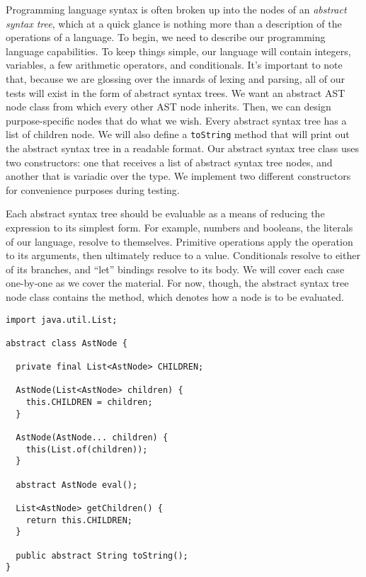 Programming language syntax is often broken up into the nodes of an \emph{abstract syntax tree}, which at a quick glance is nothing more than a description of the operations of a language. To begin, we need to describe our programming language capabilities. 
To keep things simple, our language will contain integers, variables, a few arithmetic operators, and conditionals. 
It's important to note that, because we are glossing over the innards of lexing and  parsing, all of our tests will exist in the form of abstract syntax trees.
We want an abstract AST node class from which every other AST node inherits. Then, we can design purpose-specific nodes that do what we wish. 
Every abstract syntax tree has a list of children node. We will also define a \texttt{toString} method that will print out the abstract syntax tree in a readable format. 
Our abstract syntax tree class uses two constructors: one that receives a list of abstract syntax tree nodes, and another that is variadic over the  type. We implement two different constructors for convenience purposes during testing.

Each abstract syntax tree should be evaluable as a means of reducing the expression to its simplest form. For example, numbers and booleans, the literals of our language, resolve to themselves. Primitive operations apply the operation to its arguments, then ultimately reduce to a value. Conditionals resolve to either of its branches, and ``let'' bindings resolve to its body. We will cover each case one-by-one as we cover the material. For now, though, the abstract syntax tree node class contains the  method, which denotes how a node is to be evaluated.
















\begin{lstlisting}[language=MyJava]
import java.util.List;

abstract class AstNode {

  private final List<AstNode> CHILDREN;  
 
  AstNode(List<AstNode> children) { 
    this.CHILDREN = children; 
  }

  AstNode(AstNode... children) { 
    this(List.of(children)); 
  }

  abstract AstNode eval();

  List<AstNode> getChildren() { 
    return this.CHILDREN; 
  }

  public abstract String toString();
}
\end{lstlisting}

